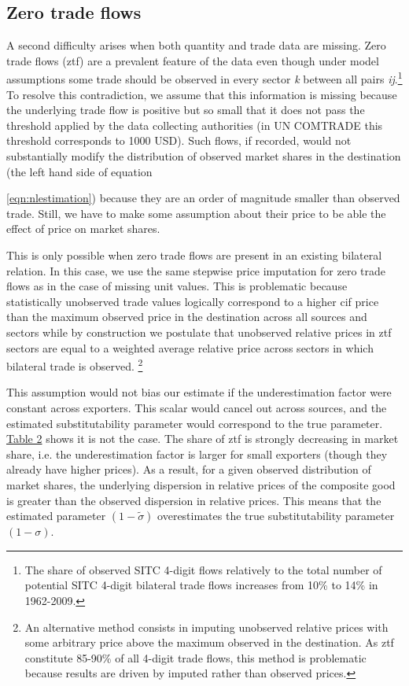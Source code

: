 \documentclass[12pt,twoside,a4paper,notitlepage]{article}
\begin{document}
\subsection{ Zero trade flows\label{mark-2.2.}}

A second difficulty arises when both quantity and trade data are missing.
Zero trade flows (ztf) are a prevalent feature of the data even though under model assumptions some trade should be observed in every sector \textit{k} between all pairs \textit{ij}.\footnote{The share of observed SITC 4-digit flows relatively to the total number of potential SITC 4-digit bilateral trade flows increases from 10\% to 14\% in 1962-2009.}
To resolve this contradiction, we assume that this information is missing because the underlying trade flow is positive but so small that it does not pass the threshold applied by the data collecting authorities (in UN COMTRADE this threshold corresponds to 1000 USD). Such flows, if recorded, would not substantially modify the distribution of observed market shares in the destination (the left hand side of equation {\ref{eqn:nlestimation}) because they are an order of magnitude smaller than observed trade. Still, we have to make some assumption about their price to be able the effect of price on market shares. 

This is only possible when zero trade flows are present in an existing bilateral relation. In this case, we use the same stepwise price imputation for zero trade flows as in the case of missing unit values. This is problematic because statistically unobserved trade values logically correspond to a higher cif price than the maximum observed price in the destination across all sources and sectors while by construction we postulate that unobserved relative prices in ztf sectors are equal to a weighted average relative price across sectors in which bilateral trade is observed.
\footnote{An alternative method consists in imputing unobserved relative prices with some arbitrary price above the maximum observed in the destination. As ztf constitute 85-90\% of all 4-digit trade flows, this method is problematic because results are driven by imputed rather than observed prices.
}

This assumption would not bias our estimate if the underestimation factor were constant across exporters. This scalar would cancel out across sources, and the estimated substitutability parameter would correspond to the true parameter. {\hyperref[ref-005]{Table 2}} shows it is not the case. The share of ztf is strongly decreasing in market share, i.e. the underestimation factor is larger for small exporters (though they already have higher prices). As a result, for a given observed distribution of market shares, the underlying dispersion in relative prices of the composite good is greater than the observed dispersion in relative prices. This means that the estimated parameter $(1-\tilde{\sigma })$ overestimates the true substitutability parameter $(1-\sigma)$.

}
\end{document}
